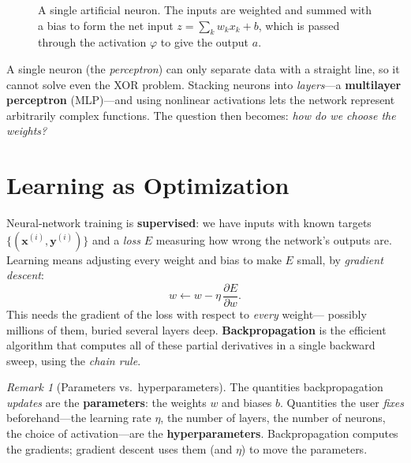 \documentclass[11pt,a4paper]{report}
\theoremstyle{definition}
\theoremstyle{remark}
\newtheorem*{remark}{Remark}
\newcommand{\vx}{\mathbf{x}}
\newcommand{\vy}{\mathbf{y}}
\newcommand{\pd}[2]{\frac{\partial #1}{\partial #2}}
\begin{document}
\begin{figure}[ht]
\centering
{}
\caption{A single artificial neuron. The inputs are weighted and summed with a
bias to form the net input $z=\sum_k w_k x_k+b$, which is passed through the
activation $\varphi$ to give the output $a$.}
\label{fig:neuron}
\end{figure}
A single neuron (the \emph{perceptron}) can only separate data with a straight
line, so it cannot solve even the XOR problem. Stacking neurons into
\emph{layers}---a \textbf{multilayer perceptron} (MLP)---and using nonlinear
activations lets the network represent arbitrarily complex functions. The
question then becomes: \emph{how do we choose the weights?}

\section{Learning as Optimization}
Neural-network training is \textbf{supervised}: we have inputs with known
targets $\{(\vx^{(i)},\vy^{(i)})\}$ and a \emph{loss} $E$ measuring how wrong
the network's outputs are. Learning means adjusting every weight and bias to
make $E$ small, by \emph{gradient descent}:
\[
w \leftarrow w-\eta\,\pd{E}{w}.
\]
This needs the gradient of the loss with respect to \emph{every} weight---
possibly millions of them, buried several layers deep.
\textbf{Backpropagation} is the efficient algorithm that computes all of these
partial derivatives in a single backward sweep, using the \emph{chain rule}.

\begin{remark}[Parameters vs.\ hyperparameters]
The quantities backpropagation \emph{updates} are the \textbf{parameters}: the
weights $w$ and biases $b$. Quantities the user \emph{fixes} beforehand---the
learning rate $\eta$, the number of layers, the number of neurons, the choice
of activation---are the \textbf{hyperparameters}. Backpropagation computes the
gradients; gradient descent uses them (and $\eta$) to move the parameters.
\end{remark}
\end{document}
